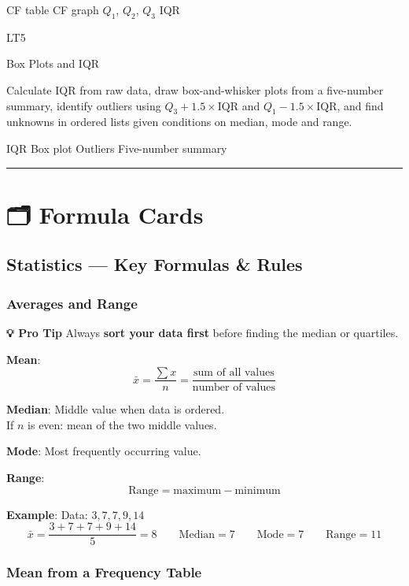 \documentclass[
  letterpaper,
  DIV=11,
  numbers=noendperiod]{scrreprt}
\theoremstyle{definition}
\theoremstyle{remark}
\begin{document}
{CF table} {CF graph} {\(Q_1\), \(Q_2\), \(Q_3\)} {IQR}

LT5

Box Plots and IQR

Calculate IQR from raw data, draw box-and-whisker plots from a
five-number summary, identify outliers using
\(Q_3 + 1.5 \times \text{IQR}\) and \(Q_1 - 1.5 \times \text{IQR}\), and
find unknowns in ordered lists given conditions on median, mode and
range.

{IQR} {Box plot} {Outliers} {Five-number summary}

\begin{center}\rule{0.5\linewidth}{0.5pt}\end{center}

\section{🗂️ Formula Cards}\label{formula-cards-2}

\subsection*{Statistics --- Key Formulas \&
Rules}\label{statistics-key-formulas-rules}

\subsubsection*{Averages and Range}\label{averages-and-range}

\textbf{💡 Pro Tip} Always \textbf{sort your data first} before finding
the median or quartiles.

\textbf{Mean}:
\[\bar{x} = \frac{\sum x}{n} = \frac{\text{sum of all values}}{\text{number of values}}\]

\textbf{Median}: Middle value when data is ordered.\\
If \(n\) is even: mean of the two middle values.

\textbf{Mode}: Most frequently occurring value.

\textbf{Range}: \[\text{Range} = \text{maximum} - \text{minimum}\]

\textbf{Example}: Data: \(3, 7, 7, 9, 14\)
\[\bar{x} = \frac{3+7+7+9+14}{5} = 8 \qquad \text{Median} = 7 \qquad \text{Mode} = 7 \qquad \text{Range} = 11\]

\subsubsection*{Mean from a Frequency
Table}\label{mean-from-a-frequency-table}
\end{document}
